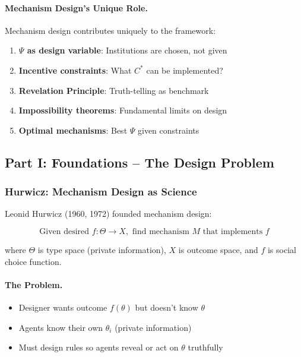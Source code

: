 \paragraph{Mechanism Design's Unique Role.}
Mechanism design contributes uniquely to the framework:
\begin{enumerate}
    \item \textbf{$\Psi$ as design variable}: Institutions are chosen, not given
    \item \textbf{Incentive constraints}: What $C^*$ can be implemented?
    \item \textbf{Revelation Principle}: Truth-telling as benchmark
    \item \textbf{Impossibility theorems}: Fundamental limits on design
    \item \textbf{Optimal mechanisms}: Best $\Psi$ given constraints
\end{enumerate}

\subsection{Part I: Foundations – The Design Problem}

\subsubsection{Hurwicz: Mechanism Design as Science}

Leonid Hurwicz (1960, 1972) founded mechanism design:

\begin{equation}
\boxed{
\text{Given desired } f: \Theta \to X, \text{ find mechanism } M \text{ that implements } f
}
\label{eq:hurwicz}
\end{equation}

where $\Theta$ is type space (private information), $X$ is outcome space, and 
$f$ is social choice function.

\paragraph{The Problem.}
\begin{itemize}
    \item Designer wants outcome $f(\theta)$ but doesn't know $\theta$
    \item Agents know their own $\theta_i$ (private information)
    \item Must design rules so agents reveal or act on $\theta$ truthfully
\end{itemize}

